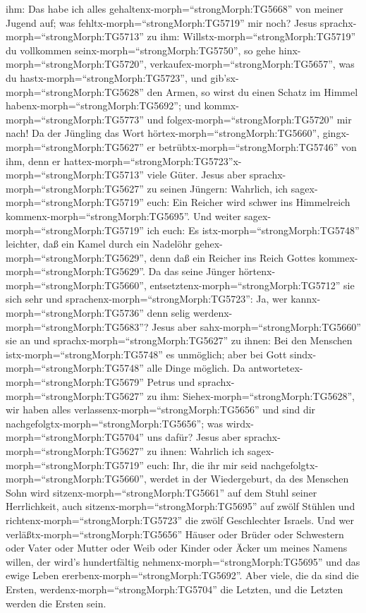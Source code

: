 ihm: Das habe ich alles gehaltenx-morph=``strongMorph:TG5668'' von
meiner Jugend auf; was fehltx-morph=``strongMorph:TG5719'' mir noch?
 Jesus sprachx-morph=``strongMorph:TG5713'' zu ihm:
Willstx-morph=``strongMorph:TG5719'' du vollkommen
seinx-morph=``strongMorph:TG5750'', so gehe
hinx-morph=``strongMorph:TG5720'',
verkaufex-morph=``strongMorph:TG5657'', was du
hastx-morph=``strongMorph:TG5723'', und
gib'sx-morph=``strongMorph:TG5628'' den Armen, so wirst du einen Schatz
im Himmel habenx-morph=``strongMorph:TG5692''; und
kommx-morph=``strongMorph:TG5773'' und
folgex-morph=``strongMorph:TG5720'' mir nach!  Da der
Jüngling das Wort hörtex-morph=``strongMorph:TG5660'',
gingx-morph=``strongMorph:TG5627'' er
betrübtx-morph=``strongMorph:TG5746'' von ihm, denn er
hattex-morph=``strongMorph:TG5723''x-morph=``strongMorph:TG5713'' viele
Güter.  Jesus aber sprachx-morph=``strongMorph:TG5627'' zu
seinen Jüngern: Wahrlich, ich sagex-morph=``strongMorph:TG5719'' euch:
Ein Reicher wird schwer ins Himmelreich
kommenx-morph=``strongMorph:TG5695''.  Und weiter
sagex-morph=``strongMorph:TG5719'' ich euch: Es
istx-morph=``strongMorph:TG5748'' leichter, daß ein Kamel durch ein
Nadelöhr gehex-morph=``strongMorph:TG5629'', denn daß ein Reicher ins
Reich Gottes kommex-morph=``strongMorph:TG5629''.  Da das
seine Jünger hörtenx-morph=``strongMorph:TG5660'',
entsetztenx-morph=``strongMorph:TG5712'' sie sich sehr und
sprachenx-morph=``strongMorph:TG5723'': Ja, wer
kannx-morph=``strongMorph:TG5736'' denn selig
werdenx-morph=``strongMorph:TG5683''?  Jesus aber
sahx-morph=``strongMorph:TG5660'' sie an und
sprachx-morph=``strongMorph:TG5627'' zu ihnen: Bei den Menschen
istx-morph=``strongMorph:TG5748'' es unmöglich; aber bei Gott
sindx-morph=``strongMorph:TG5748'' alle Dinge möglich.  Da
antwortetex-morph=``strongMorph:TG5679'' Petrus und
sprachx-morph=``strongMorph:TG5627'' zu ihm:
Siehex-morph=``strongMorph:TG5628'', wir haben alles
verlassenx-morph=``strongMorph:TG5656'' und sind dir
nachgefolgtx-morph=``strongMorph:TG5656''; was
wirdx-morph=``strongMorph:TG5704'' uns dafür?  Jesus aber
sprachx-morph=``strongMorph:TG5627'' zu ihnen: Wahrlich ich
sagex-morph=``strongMorph:TG5719'' euch: Ihr, die ihr mir seid
nachgefolgtx-morph=``strongMorph:TG5660'', werdet in der Wiedergeburt,
da des Menschen Sohn wird sitzenx-morph=``strongMorph:TG5661'' auf dem
Stuhl seiner Herrlichkeit, auch sitzenx-morph=``strongMorph:TG5695'' auf
zwölf Stühlen und richtenx-morph=``strongMorph:TG5723'' die zwölf
Geschlechter Israels.  Und wer
verläßtx-morph=``strongMorph:TG5656'' Häuser oder Brüder oder Schwestern
oder Vater oder Mutter oder Weib oder Kinder oder Äcker um meines Namens
willen, der wird's hundertfältig nehmenx-morph=``strongMorph:TG5695''
und das ewige Leben ererbenx-morph=``strongMorph:TG5692''. 
Aber viele, die da sind die Ersten, werdenx-morph=``strongMorph:TG5704''
die Letzten, und die Letzten werden die Ersten sein.

